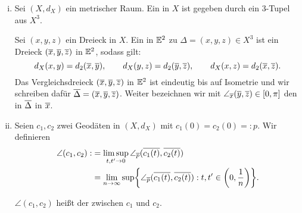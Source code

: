 \begin{definition}
\label{def:2.41}
	\begin{enumerate}[(i)]
		\item Sei $(X,d_X)$ ein metrischer Raum. 
		Ein  in $X$ ist gegeben durch ein $3$-Tupel aus $X^3$.
		
		Sei $(x,y,z)$ ein Dreieck in $X$.
		Ein  in $\mathbb{E}^2$ zu $\Delta = (x,y,z) \in X^3$ ist ein Dreieck $(\overline{x},\overline{y},\overline{z})$ in $\mathbb{E}^2$, sodass gilt:
		\[
			d_X(x,y) = d_2(\overline{x},\overline{y}), \qquad d_X(y,z) = d_2(\overline{y},\overline{z}), \qquad d_X(x,z) = d_2(\overline{x},\overline{z}).
		\]
		Das Vergleichsdreieck $(\overline{x},\overline{y},\overline{z})$ in $\mathbb{E}^2$ ist eindeutig bis auf Isometrie und wir schreiben dafür $\overline{\Delta} = (\overline{x},\overline{y},\overline{z})$.
		Weiter bezeichnen wir mit $\angle_{\overline{x}}(\overline{y},\overline{z}) \in [0,\pi]$ den  in $\overline{\Delta}$ in $\overline{x}$.
		\newpage
		\item Seien $c_1,c_2$ zwei Geodäten in $(X,d_X)$ mit $c_1(0) = c_2(0) =:p$.
		Wir definieren
		\begin{align*}
			\angle(c_1,c_2) :&= \limsup_{t,t' \rightarrow 0} \angle_{\ol{p}} (\ol{c_1(t)},\ol{c_2(t)}) \\
			&= \lim\limits_{n \rightarrow \infty} \sup \penbrace*{ \angle_{\ol{p}}(\ol{c_1(t)},\ol{c_2(t)}) : t,t' \in \enbrace*{0,\frac{1}{n}}}.
		\end{align*}
		
		$\angle(c_1,c_2)$ heißt der  zwischen $c_1$ und $c_2$.
	\end{enumerate}
\end{definition}

